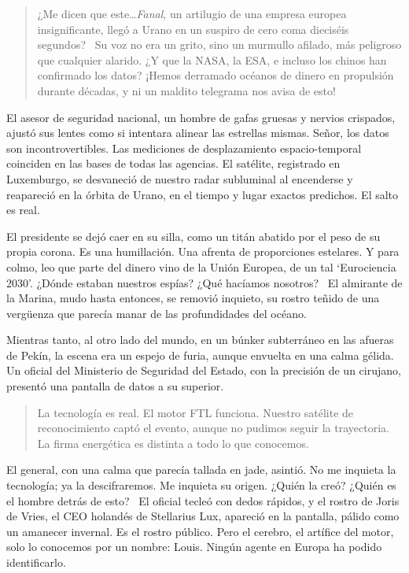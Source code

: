 \begin{quote}
\calli
\glqq ¿Me dicen que este\ldots \emph{Fanal}, un artilugio de una empresa europea insignificante, llegó a Urano en un suspiro de cero coma dieciséis segundos?\grqq~ Su voz no era un grito, sino un murmullo afilado, más peligroso que cualquier alarido. \glqq ¿Y que la NASA, la ESA, e incluso los chinos han confirmado los datos? ¡Hemos derramado océanos de dinero en propulsión durante décadas, y ni un maldito telegrama nos avisa de esto!\grqq
\end{quote}

El asesor de seguridad nacional, un hombre de gafas gruesas y nervios crispados, ajustó sus lentes como si intentara alinear las estrellas mismas. \glqq Señor, los datos son incontrovertibles. Las mediciones de desplazamiento espacio-temporal coinciden en las bases de todas las agencias. El satélite, registrado en Luxemburgo, se desvaneció de nuestro radar subluminal al encenderse y reapareció en la órbita de Urano, en el tiempo y lugar exactos predichos. El salto es real.\grqq

El presidente se dejó caer en su silla, como un titán abatido por el peso de su propia corona. \glqq Es una humillación. Una afrenta de proporciones estelares. Y para colmo, leo que parte del dinero vino de la Unión Europea, de un tal `Eurociencia 2030'. ¿Dónde estaban nuestros espías? ¿Qué hacíamos nosotros?\grqq~ El almirante de la Marina, mudo hasta entonces, se removió inquieto, su rostro teñido de una vergüenza que parecía manar de las profundidades del océano.

Mientras tanto, al otro lado del mundo, en un búnker subterráneo en las afueras de Pekín, la escena era un espejo de furia, aunque envuelta en una calma gélida. Un oficial del Ministerio de Seguridad del Estado, con la precisión de un cirujano, presentó una pantalla de datos a su superior.

\begin{quote}
\calli
\glqq La tecnología es real. El motor FTL funciona. Nuestro satélite de reconocimiento captó el evento, aunque no pudimos seguir la trayectoria. La firma energética es distinta a todo lo que conocemos.\grqq
\end{quote}

El general, con una calma que parecía tallada en jade, asintió. \glqq No me inquieta la tecnología; ya la descifraremos. Me inquieta su origen. ¿Quién la creó? ¿Quién es el hombre detrás de esto?\grqq~ El oficial tecleó con dedos rápidos, y el rostro de Joris de Vries, el CEO holandés de Stellarius Lux, apareció en la pantalla, pálido como un amanecer invernal. \glqq Es el rostro público. Pero el cerebro, el artífice del motor, solo lo conocemos por un nombre: Louis. Ningún agente en Europa ha podido identificarlo.\grqq

